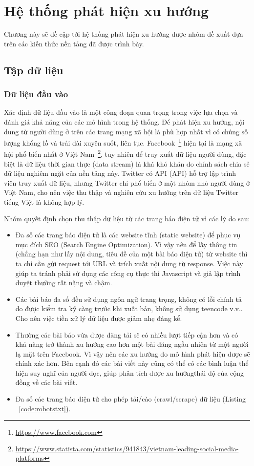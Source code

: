 \chapter{Hệ thống phát hiện xu hướng}
\label{chap:thesystem}
Chương này sẽ đề cập tới hệ thống phát hiện xu hướng được nhóm đề xuất dựa trên các kiến thức nền tảng đã được trình bày.

\section{Tập dữ liệu}
\subsection{Dữ liệu đầu vào}
Xác định dữ liệu đầu vào là một công đoạn quan trọng trong việc lựa chọn và đánh giá khả năng của các mô hình trong hệ thống. Để phát hiện xu hướng, nội dung từ người dùng ở trên các trang mạng xã hội là phù hợp nhất vì có chúng số lượng khổng lồ và trải dài xuyên suốt, liên tục. Facebook~\footnote{\url{https://www.facebook.com}} hiện tại là mạng xã hội phổ biến nhất ở Việt Nam~\footnote{\url{https://www.statista.com/statistics/941843/vietnam-leading-social-media-platforms}}, tuy nhiên để truy xuất dữ liệu người dùng, đặc biệt là dữ liệu thời gian thực (data stream) là khá khó khăn do chính sách chia sẻ dữ liệu nghiêm ngặt của nền tảng này. Twitter có \acrshort{API} (\acrlong{API}) hỗ trợ lập trình viên truy xuất dữ liệu, nhưng Twitter chỉ phổ biến ở một nhóm nhỏ người dùng ở Việt Nam, cho nên việc thu thập và nghiên cứu xu hướng trên dữ liệu Twitter tiếng Việt là không hợp lý.

Nhóm quyết định chọn thu thập dữ liệu từ các trang báo điện tử vì các lý do sau:
\begin{itemize}
    \item Đa số các trang báo điện tử là các website tĩnh (static website) để phục vụ mục đích SEO (Search Engine Optimization). Vì vậy nên để lấy thông tin (chẳng hạn như lấy nội dung, tiêu đề của một bài báo điện tử) từ website thì ta chỉ cần gửi request tới URL và trích xuất nội dung từ response. Việc này giúp ta tránh phải sử dụng các công cụ thực thi Javascript và giả lập trình duyệt thường rất nặng và chậm.
    \item Các bài báo đa số đều sử dụng ngôn ngữ trang trọng, không có lỗi chính tả do được kiểm tra kỹ càng trước khi xuất bản, không sử dụng teencode v.v.. Cho nên việc tiền xử lý dữ liệu được giảm nhẹ đáng kể.
    \item Thường các bài báo vừa được đăng tải sẽ có nhiều lượt tiếp cận hơn và có khả năng trở thành xu hướng cao hơn một bài đăng ngẫu nhiên từ một người lạ mặt trên Facebook. Vì vậy nên các xu hướng do mô hình phát hiện được sẽ chính xác hơn. Bên cạnh đó các bài viết này cũng có thể có các bình luận thể hiện suy nghĩ của người đọc, giúp phân tích được xu hướngthái độ của cộng đồng về các bài viết.
    \item Đa số các trang báo điện tử cho phép tải/cào (crawl/scrape) dữ liệu (Listing ~\ref{code:robotstxt}). 
\end{itemize}


